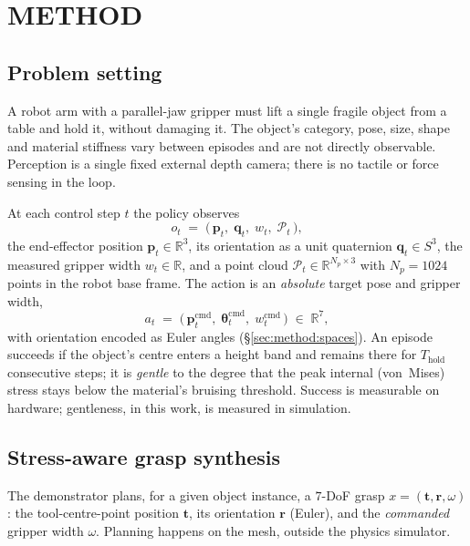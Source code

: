 \documentclass[letterpaper, 10 pt, conference]{ieeeconf}  %
\begin{document}
\section{METHOD}
\subsection{Problem setting}
\label{sec:method:problem}

A robot arm with a parallel-jaw gripper must lift a single fragile object from a table and
hold it, without damaging it. The object's category, pose, size, shape and material stiffness vary between episodes and are not directly observable. Perception is a single fixed external
depth camera; there is no tactile or force sensing in the loop.

At each control step $t$ the policy observes
\begin{equation}
  o_t \;=\; \bigl(\, \mathbf{p}_t,\; \mathbf{q}_t,\; w_t,\; \mathcal{P}_t \,\bigr),
  \label{eq:obs}
\end{equation}
the end-effector position $\mathbf{p}_t\!\in\!\mathbb{R}^3$, its orientation as a unit
quaternion $\mathbf{q}_t\!\in\!S^3$, the measured gripper width $w_t\!\in\!\mathbb{R}$, and a
point cloud $\mathcal{P}_t\!\in\!\mathbb{R}^{N_p\times 3}$ with $N_p\!=\!1024$ points in the
robot base frame. The action is an \emph{absolute} target pose and gripper width,
\begin{equation}
  a_t \;=\; \bigl(\, \mathbf{p}^{\mathrm{cmd}}_t,\; \boldsymbol{\theta}^{\mathrm{cmd}}_t,\;
                    w^{\mathrm{cmd}}_t \,\bigr) \;\in\; \mathbb{R}^{7},
  \label{eq:act}
\end{equation}
with orientation encoded as Euler angles (\S\ref{sec:method:spaces}). An episode succeeds if
the object's centre enters a height band and remains there for $T_{\text{hold}}$ consecutive
steps; it is \emph{gentle} to the degree that the peak internal (von~Mises) stress stays
below the material's bruising threshold. Success is measurable on hardware; gentleness, in
this work, is measured in simulation.

\subsection{Stress-aware grasp synthesis}
\label{sec:method:synth}

The demonstrator plans, for a given object instance, a $7$-DoF grasp
$x = (\mathbf{t}, \mathbf{r}, \omega)$: the tool-centre-point position $\mathbf{t}$, its
orientation $\mathbf{r}$ (Euler), and the \emph{commanded} gripper width $\omega$. Planning
happens on the mesh, outside the physics simulator.
\end{document}
